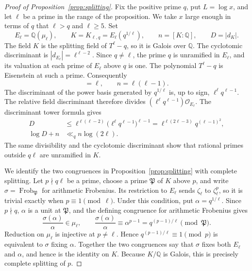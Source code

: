 \begin{proof}[Proof of Proposition~\ref{prop:splitting}]
Fix the positive prime \(q\), put \(L=\log x\), and let \(\ell\) be a prime
in the range of the proposition.  We take \(x\) large enough in terms of
\(q\) that \(\ell>q\) and \(\ell\ge5\).  Set
\[
 E_\ell=\mathbb Q(\mu_\ell),\qquad
 K=K_{\ell,q}=E_\ell(q^{1/\ell}),\qquad
 n=[K:\mathbb Q],\qquad D=|d_K|.
\]
The field \(K\) is the splitting field of \(T^\ell-q\), so it is Galois
over \(\mathbb Q\).  The cyclotomic discriminant is
\(|d_{E_\ell}|=\ell^{\ell-2}\).  Since \(q\ne\ell\), the prime \(q\) is
unramified in \(E_\ell\), and its valuation at each prime of \(E_\ell\)
above \(q\) is one.  The polynomial \(T^\ell-q\) is Eisenstein at such a
prime.  Consequently
\begin{equation}
 [K:E_\ell]=\ell,\qquad n=\ell(\ell-1).
 \label{eq:kummer-degree}
\end{equation}
The discriminant of the power basis generated by \(q^{1/\ell}\) is, up to
sign, \(\ell^\ell q^{\ell-1}\).  The relative field discriminant therefore
divides \((\ell^\ell q^{\ell-1})\mathcal O_{E_\ell}\).  The discriminant
tower formula gives
\begin{equation}
 \begin{aligned}
 D&\le \ell^{\ell(\ell-2)}
       \bigl(\ell^\ell q^{\ell-1}\bigr)^{\ell-1}
    =\ell^{\ell(2\ell-3)}q^{(\ell-1)^2},\\
 \log D+n&\ll_q n\log(2\ell).
 \end{aligned}
 \label{eq:kummer-discriminant}
\end{equation}
The same divisibility and the cyclotomic discriminant show that rational
primes outside \(q\ell\) are unramified in \(K\).

We identify the two congruences in Proposition~\ref{prop:splitting} with
complete splitting.  Let \(p\nmid q\ell\) be a prime, choose a prime
\(\mathfrak P\) of \(K\) above \(p\), and write
\(\sigma=\operatorname{Frob}_{\mathfrak P}\) for arithmetic Frobenius.
Its restriction to \(E_\ell\) sends \(\zeta_\ell\) to \(\zeta_\ell^p\),
so it is trivial exactly when \(p\equiv1\pmod\ell\).  Under this condition,
put \(\alpha=q^{1/\ell}\).  Since \(p\nmid q\), \(\alpha\) is a unit at
\(\mathfrak P\), and the defining congruence for arithmetic Frobenius gives
\[
 \frac{\sigma(\alpha)}{\alpha}\in\mu_\ell,\qquad
 \frac{\sigma(\alpha)}{\alpha}
   \equiv\alpha^{p-1}=q^{(p-1)/\ell}\pmod{\mathfrak P}.
\]
Reduction on \(\mu_\ell\) is injective at \(p\ne\ell\).  Hence
\(q^{(p-1)/\ell}\equiv1\pmod p\) is equivalent to \(\sigma\) fixing
\(\alpha\).  Together the two congruences say that \(\sigma\) fixes both
\(E_\ell\) and \(\alpha\), and hence is the identity on \(K\).  Because
\(K/\mathbb Q\) is Galois, this is precisely complete splitting of \(p\).


\end{proof}
